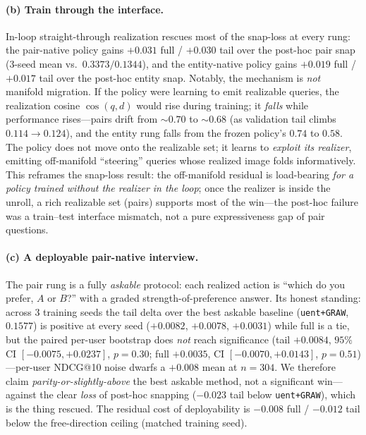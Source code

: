 \documentclass[11pt]{article}
\begin{document}
\paragraph{(b) Train through the interface.} In-loop straight-through realization rescues most of the snap-loss at
every rung: the pair-native policy gains $+0.031$ full / $+0.030$ tail over the post-hoc pair snap ($3$-seed mean vs.\
$0.3373/0.1344$), and the entity-native policy gains $+0.019$ full / $+0.017$ tail over the post-hoc entity snap.
Notably, the mechanism is \emph{not} manifold migration. If the policy were learning to emit realizable queries, the
realization cosine $\cos(q,d)$ would rise during training; it \emph{falls} while performance rises---pairs drift from
${\sim}0.70$ to ${\sim}0.68$ (as validation tail climbs $0.114\!\to\!0.124$), and the entity rung falls from the frozen
policy's $0.74$ to $0.58$. The policy does not move onto the realizable set; it learns to \emph{exploit its realizer},
emitting off-manifold ``steering'' queries whose realized image folds informatively. This reframes the snap-loss
result: the off-manifold residual is load-bearing \emph{for a policy trained without the realizer in the loop}; once
the realizer is inside the unroll, a rich realizable set (pairs) supports most of the win---the post-hoc failure was a
train--test interface mismatch, not a pure expressiveness gap of pair questions.

\paragraph{(c) A deployable pair-native interview.} The pair rung is a fully \emph{askable} protocol: each realized
action is ``which do you prefer, $A$ or $B$?'' with a graded strength-of-preference answer. Its honest standing:
across $3$ training seeds the tail delta over the best askable baseline (\texttt{uent+GRAW}, $0.1577$) is positive at
every seed ($+0.0082$, $+0.0078$, $+0.0031$) while full is a tie, but the paired per-user bootstrap does \emph{not}
reach significance (tail $+0.0084$, $95\%$ CI $[-0.0075,+0.0237]$, $p{=}0.30$; full $+0.0035$, CI
$[-0.0070,+0.0143]$, $p{=}0.51$)---per-user NDCG@10 noise dwarfs a $+0.008$ mean at $n{=}304$. We therefore claim
\emph{parity-or-slightly-above} the best askable method, not a significant win---against the clear \emph{loss} of
post-hoc snapping ($-0.023$ tail below \texttt{uent+GRAW}), which is the thing rescued. The residual cost of
deployability is $-0.008$ full / $-0.012$ tail below the free-direction ceiling (matched training seed).
\end{document}
